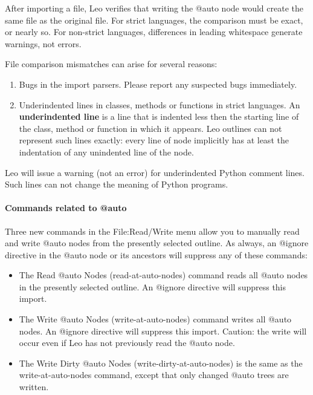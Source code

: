 \documentclass[a4paper,10pt,english]{sphinxmanual}
\begin{document}
After importing a file, Leo verifies that writing the @auto node would create
the same file as the original file. For strict languages, the comparison must be
exact, or nearly so. For non-strict languages, differences in leading whitespace
generate warnings, not errors.

File comparison mismatches can arise for several reasons:
\begin{enumerate}
\item {} 
Bugs in the import parsers. Please report any suspected bugs immediately.

\item {} 
Underindented lines in classes, methods or functions in strict languages. An
\textbf{underindented line} is a line that is indented less then the starting line
of the class, method or function in which it appears. Leo outlines can not
represent such lines exactly: every line of node implicitly has at least the
indentation of any unindented line of the node.

\end{enumerate}

Leo will issue a warning (not an error) for underindented Python comment lines.
Such lines can not change the meaning of Python programs.


\paragraph{Commands related to @auto}
\label{what-is-new:commands-related-to-auto}
Three new commands in the File:Read/Write menu allow you to manually read and
write @auto nodes from the presently selected outline. As always, an @ignore
directive in the @auto node or its ancestors will suppress any of these
commands:
\begin{itemize}
\item {} 
The Read @auto Nodes (read-at-auto-nodes) command reads all @auto nodes in the
presently selected outline. An @ignore directive will suppress this import.

\item {} 
The Write @auto Nodes (write-at-auto-nodes) command writes all @auto nodes. An
@ignore directive will suppress this import. Caution: the write will occur even
if Leo has not previously read the @auto node.

\item {} 
The Write Dirty @auto Nodes (write-dirty-at-auto-nodes) is the same as the
write-at-auto-nodes command, except that only changed @auto trees are written.

\end{itemize}
\end{document}
